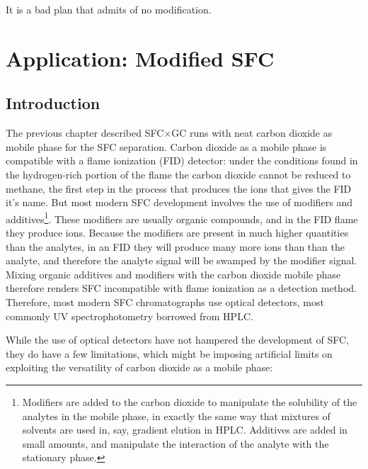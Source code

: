 
\begin{savequote}[\quotewidth]
It is a bad plan that admits of no modification.
\end{savequote}

\chapter{Application: Modified SFC} %

\label{Chapter7} %

\section{Introduction}

The previous chapter described SFC×GC runs with neat carbon dioxide as mobile
phase for the SFC separation. Carbon dioxide as a mobile phase is compatible with
a flame ionization (FID) detector: under the conditions found in the
hydrogen-rich portion of the flame the carbon dioxide cannot be reduced to
methane, the first step in the process that produces the ions that gives the FID
it's name. But most modern SFC development involves the use of modifiers and
additives\footnote{Modifiers are added to the carbon dioxide to manipulate the
solubility of the analytes in the mobile phase, in exactly the same way that
mixtures of solvents are used in, say, gradient elution in HPLC. Additives are
added in small amounts, and manipulate the interaction of the analyte with the
stationary phase.}. These modifiers are usually organic compounds, and in the FID
flame they produce ions. Because the modifiers are present in much higher
quantities than the analytes, in an FID they will produce many more ions than
than the analyte, and therefore the analyte signal will be swamped by the
modifier signal. Mixing organic additives and modifiers
with the carbon dioxide mobile phase therefore renders SFC incompatible
with flame ionization as a detection method. Therefore, most modern SFC
chromatographs use optical detectors, most commonly UV spectrophotometry
borrowed from HPLC.

While the use of optical detectors have not hampered the development of SFC,
they do have a few limitations, which might be imposing artificial limits on
exploiting the versatility of carbon dioxide as a mobile phase:

